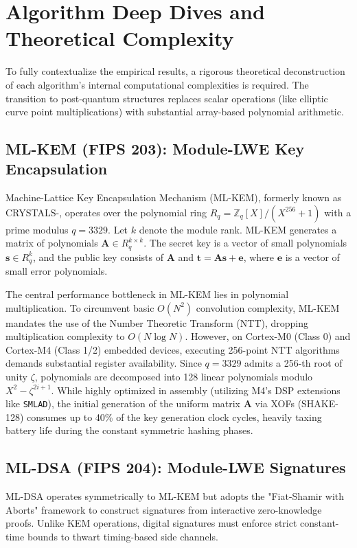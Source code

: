 \section{Algorithm Deep Dives and Theoretical Complexity}
\label{sec:algo_deep_dives}

To fully contextualize the empirical results, a rigorous theoretical deconstruction of each algorithm's internal computational complexities is required. The transition to post-quantum structures replaces scalar operations (like elliptic curve point multiplications) with substantial array-based polynomial arithmetic.

\subsection{ML-KEM (FIPS 203): Module-LWE Key Encapsulation}
Machine-Lattice Key Encapsulation Mechanism (ML-KEM), formerly known as CRYSTALS-\kyber{}, operates over the polynomial ring $R_q = \mathbb{Z}_q[X]/(X^{256} + 1)$ with a prime modulus $q = 3329$. Let $k$ denote the module rank. ML-KEM generates a matrix of polynomials $\mathbf{A} \in R_q^{k \times k}$. The secret key is a vector of small polynomials $\mathbf{s} \in R_q^k$, and the public key consists of $\mathbf{A}$ and $\mathbf{t} = \mathbf{A}\mathbf{s} + \mathbf{e}$, where $\mathbf{e}$ is a vector of small error polynomials.

The central performance bottleneck in ML-KEM lies in polynomial multiplication. To circumvent basic $O(N^2)$ convolution complexity, ML-KEM mandates the use of the Number Theoretic Transform (NTT), dropping multiplication complexity to $O(N \log N)$. However, on Cortex-M0 (Class 0) and Cortex-M4 (Class 1/2) embedded devices, executing 256-point NTT algorithms demands substantial register availability. Since $q=3329$ admits a 256-th root of unity $\zeta$, polynomials are decomposed into 128 linear polynomials modulo $X^2 - \zeta^{2i+1}$. While highly optimized in assembly (utilizing M4's DSP extensions like \texttt{SMLAD}), the initial generation of the uniform matrix $\mathbf{A}$ via XOFs (SHAKE-128) consumes up to 40\% of the key generation clock cycles, heavily taxing battery life during the constant symmetric hashing phases.

\subsection{ML-DSA (FIPS 204): Module-LWE Signatures}
ML-DSA operates symmetrically to ML-KEM but adopts the "Fiat-Shamir with Aborts" framework to construct signatures from interactive zero-knowledge proofs. Unlike KEM operations, digital signatures must enforce strict constant-time bounds to thwart timing-based side channels. 

